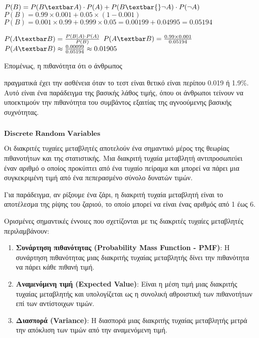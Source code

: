 \documentclass[11pt]{article}
\makeatletter
\newcommand{\boxspacing}{\kern\kvtcb@left@rule\kern\kvtcb@boxsep}
\newcommand{\prompt}[4]{
        {\ttfamily\llap{{\color{#2}[#3]:\hspace{3pt}#4}}\vspace{-\baselineskip}}
    }
\makeatother
\begin{document}
$ P(B) = P(B\textbar A) \cdot P(A) + P(B\textbar{}\neg A)
\cdot P(\neg A) $ $ P(B) = 0.99 \times 0.001 + 0.05 \times (1-0.001)
$ $ P(B) = 0.001 \times 0.99 + 0.999 \times 0.05 = 0.00199 + 0.04995 =
0.05194 $

$ P(A\textbar B) = \frac{P(B|A) \cdot P(A)}{P(B)} $ $ P(A\textbar B)
= \frac{0.99 \times 0.001}{0.05194} $ $ P(A\textbar B) \approx
\frac{0.00099}{0.05194} \approx 0.01905 $

Επομένως, η πιθανότητα ότι ο άνθρωπος

πραγματικά έχει την ασθένεια όταν το τεστ είναι θετικό είναι περίπου
0.019 ή 1.9\%. Αυτό είναι ένα παράδειγμα της βασικής λάθος τιμής, όπου
οι άνθρωποι τείνουν να υποεκτιμούν την πιθανότητα του συμβάντος εξαιτίας
της αγνοούμενης βασικής συχνότητας.

    \begin{tcolorbox}[breakable, size=fbox, boxrule=1pt, pad at break*=1mm,colback=cellbackground, colframe=cellborder]
\prompt{In}{incolor}{ }{\boxspacing}
\begin{Verbatim}[commandchars=\\\{\}]

\end{Verbatim}
\end{tcolorbox}

    \(\textbf{Discrete Random Variables}\)

    Οι διακριτές τυχαίες μεταβλητές αποτελούν ένα σημαντικό μέρος της
θεωρίας πιθανοτήτων και της στατιστικής. Μια διακριτή τυχαία μεταβλητή
αντιπροσωπεύει έναν αριθμό ο οποίος προκύπτει από ένα τυχαίο πείραμα και
μπορεί να πάρει μια συγκεκριμένη τιμή από ένα πεπερασμένο σύνολο δυνατών
τιμών.

Για παράδειγμα, αν ρίξουμε ένα ζάρι, η διακριτή τυχαία μεταβλητή είναι
το αποτέλεσμα της ρίψης του ζαριού, το οποίο μπορεί να είναι ένας
αριθμός από 1 έως 6.

Ορισμένες σημαντικές έννοιες που σχετίζονται με τις διακριτές τυχαίες
μεταβλητές περιλαμβάνουν:

\begin{enumerate}
\def\labelenumi{\arabic{enumi}.}
\item
  \textbf{Συνάρτηση πιθανότητας (Probability Mass Function - PMF)}: Η
  συνάρτηση πιθανότητας μιας διακριτής τυχαίας μεταβλητής δίνει την
  πιθανότητα να πάρει κάθε πιθανή τιμή.
\item
  \textbf{Αναμενόμενη τιμή (Expected Value)}: Είναι η μέση τιμή μιας
  διακριτής τυχαίας μεταβλητής και υπολογίζεται ως η συνολική αθροιστική
  των πιθανοτήτων επί των αντίστοιχων τιμών.
\item
  \textbf{Διασπορά (Variance)}: Η διασπορά μιας διακριτής τυχαίας
  μεταβλητής μετρά την απόκλιση των τιμών από την αναμενόμενη τιμή.
\end{enumerate}
\end{document}
